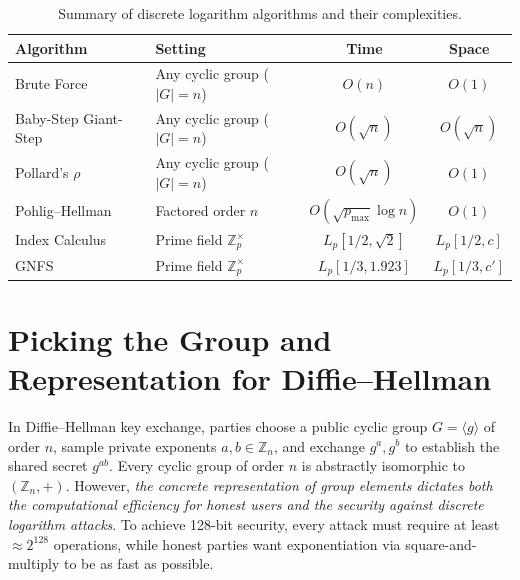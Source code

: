 
\begin{table}[htbp]
    \centering
    \small
    \setlength{\tabcolsep}{4pt}
    \begin{tabular}{@{}llcc@{}}
        \toprule
        \textbf{Algorithm} & \textbf{Setting} & \textbf{Time} & \textbf{Space} \\
        \midrule
        Brute Force & Any cyclic group (\(|G| = n\)) & \(O(n)\) & \(O(1)\) \\
        Baby-Step Giant-Step~\cite{Shanks1971} & Any cyclic group (\(|G| = n\)) & \(O(\sqrt{n})\) & \(O(\sqrt{n})\) \\
        Pollard's \(\rho\)~\cite{Pollard1978} & Any cyclic group (\(|G| = n\)) & \(O(\sqrt{n})\) & \(O(1)\) \\
        Pohlig--Hellman~\cite{PohligHellman1978} & Factored order \(n\) & \(O(\sqrt{p_{\max}} \log n)\) & \(O(1)\) \\
        Index Calculus & Prime field \(\mathbb{Z}_p^\times\) & \(L_p[1/2, \sqrt{2}]\) & \(L_p[1/2, c]\) \\
        GNFS & Prime field \(\mathbb{Z}_p^\times\) & \(L_p[1/3, 1.923]\) & \(L_p[1/3, c']\) \\
        \bottomrule
    \end{tabular}
    \caption{Summary of discrete logarithm algorithms and their complexities.}
    \label{tab:dlog-algorithms}
\end{table}

\section*{Picking the Group and Representation for Diffie--Hellman}

In Diffie--Hellman key exchange, parties choose a public cyclic group \(G = \langle g \rangle\) of order \(n\), sample private exponents \(a, b \in \mathbb{Z}_n\), and exchange \(g^a, g^b\) to establish the shared secret \(g^{ab}\).
Every cyclic group of order \(n\) is abstractly isomorphic to \((\mathbb{Z}_n, +)\).
However, \emph{the concrete representation of group elements dictates both the computational efficiency for honest users and the security against discrete logarithm attacks}.
To achieve 128-bit security, every attack must require at least \(\approx 2^{128}\) operations, while honest parties want exponentiation via square-and-multiply to be as fast as possible.

